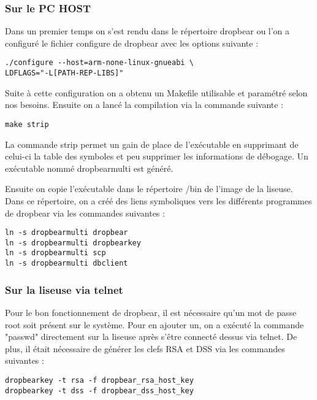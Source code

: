 \subsubsection{Sur le PC HOST}

Dans un premier temps on s'est rendu dans le répertoire dropbear ou l'on a configuré le fichier configure de dropbear avec les options suivante :

\begin{lstlisting}
./configure --host=arm-none-linux-gnueabi \
LDFLAGS="-L[PATH-REP-LIBS]"
\end{lstlisting} 

Suite à cette configuration on a obtenu un Makefile utilisable et paramétré selon nos besoins.
Ensuite on a lancé la compilation via la commande suivante :

\begin{lstlisting}
make strip
\end{lstlisting}

La commande strip permet un gain de place de l'exécutable en supprimant de celui-ci la table des symboles et peu supprimer les informations de débogage. Un exécutable nommé dropbearmulti est généré.

Ensuite on copie l'exécutable dans le répertoire /bin de l'image de la liseuse. Dans ce répertoire, on a créé des liens symboliques vers les différents programmes de dropbear via les commandes suivantes :

\begin{lstlisting}
ln -s dropbearmulti dropbear
ln -s dropbearmulti dropbearkey
ln -s dropbearmulti scp
ln -s dropbearmulti dbclient
\end{lstlisting}  

\subsubsection{Sur la liseuse via telnet}

Pour le bon fonctionnement de dropbear, il est nécessaire qu'un mot de passe root soit présent sur le système. Pour en ajouter un, on a exécuté la commande "passwd" directement sur la liseuse après s'être connecté dessus via telnet.
De plus, il était nécessaire de générer les clefs RSA et DSS via les commandes suivantes :

\begin{lstlisting}
dropbearkey -t rsa -f dropbear_rsa_host_key
dropbearkey -t dss -f dropbear_dss_host_key
\end{lstlisting}

